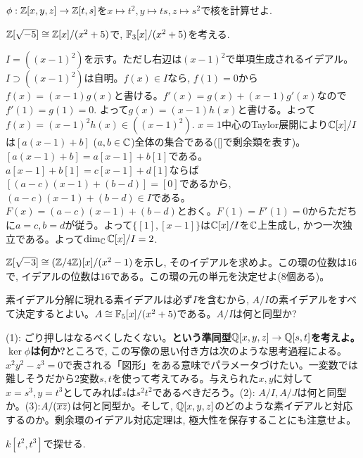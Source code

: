 {\small
\begin{probans}
$\phi:\mathbb{Z}[x,y,z] \to \mathbb{Z}[t,s]$を$x\mapsto t^2,y\mapsto ts, z\mapsto s^2$で核を計算せよ.
\end{probans}
\begin{probans}
$\mathbb{Z}[\sqrt{-5}]\cong \mathbb{Z}[x]/(x^2+5)$で, $\mathbb{F}_{3}[x]/(x^2+5)$を考える.
\end{probans}
\begin{probans}
$I=((x-1)^2)$を示す。ただし右辺は$(x-1)^2$で単項生成されるイデアル。$I\supset ((x-1)^2)$は自明。$f(x)\in I$なら, $f(1)=0$から$f(x) = (x-1)g(x)$と書ける。$f'(x) = g(x) + (x-1)g'(x)$なので$f'(1) = g(1) = 0$. よって$g(x)=(x-1)h(x)$と書ける。よって$f(x) = (x-1)^2 h(x) \in ((x-1)^2)$.  $x=1$中心のTaylor展開により$\mathbb{C}[x]/I$は$[a(x-1)+b]$ ($a,b\in \mathbb{C}$)全体の集合である([]で剰余類を表す)。$[a(x-1)+b] = a[x-1] + b[1]$である。$a[x-1]+b[1] = c[x-1] + d[1]$ならば$[(a-c)(x-1) + (b-d)] = [0]$であるから, $(a-c)(x-1) + (b-d) \in I$である。$F(x) = (a-c)(x-1)+(b-d)$とおく。$F(1) = F'(1) = 0$からただちに$a=c, b=d$が従う。よって$\{ [1], [x-1] \}$は$\mathbb{C}[x]/I$を$\mathbb{C}$上生成し, かつ一次独立である。よって$\dim_{\mathbb{C}}\mathbb{C}[x]/I = 2$.
\end{probans}


\begin{probans}
$\mathbb{Z}[\sqrt{-3}] \cong (\mathbb{Z}/4\mathbb{Z})[x]/(x^2-1)$を示し, そのイデアルを求めよ。この環の位数は16で, イデアルの位数は$16$である。この環の元の単元を決定せよ(8個ある)。
\end{probans}
\begin{probans}
\end{probans}
\begin{probans}
\end{probans}
\begin{probans}
素イデアル分解に現れる素イデアルは必ず$I$を含むから, $A/I$の素イデアルをすべて決定するとよい。$A\cong \mathbb{F}_{5}[x]/(x^2+5)$である。$A/I$は何と同型か?
\end{probans}
\begin{probans}
(1): ごり押しはなるべくしたくない。\textbf{という準同型$\mathbb{Q}[x,y,z]\to \mathbb{Q}[s,t]$を考えよ。$\ker{\phi}$は何か?}ところで, この写像の思い付き方は次のような思考過程による。$x^2y^2-z^3=0$で表される「図形」をある意味でパラメータづけたい。一変数では難しそうだから2変数$s,t$を使って考えてみる。与えられた$x,y$に対して$x=s^3, y=t^3$としてみれば$z$は$s^2t^2$であるべきだろう。(2): $A/I,A/J$は何と同型か。(3):$A/(\overline{x}\overline{z})$は何と同型か。そして, $\mathbb{Q}[x,y,z]$のどのような素イデアルと対応するのか。剰余環のイデアル対応定理は, 極大性を保存することにも注意せよ。
\end{probans}
\begin{probans}
$k[t^2,t^3]$で探せる.
\end{probans}
}


\clearpage
